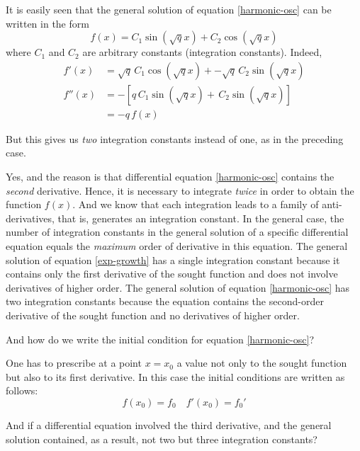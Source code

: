 It is easily seen that the general solution of equation \eqref{harmonic-osc} can be written in the form
\begin{equation}%
f(x)= C_{1} \sin (\sqrt{q} x) + C_{2} \cos (\sqrt{q}x)
 \label{harmonic-soln}
\end{equation}
where $C_{1}$ and $C_{2}$ are arbitrary constants (integration constants). Indeed, 
\begin{align*}%
f'(x) &= \sqrt{q} \, C_{1} \cos (\sqrt{q} x) + - \sqrt{q} \, C_{2} \sin (\sqrt{q}x) \\
f''(x) &= -[q  \, C_{1} \sin (\sqrt{q} x) + \, C_{2} \sin (\sqrt{q}x) ]\\
& = -q \, f(x)
\end{align*}

\rdr But this gives us \emph{two} integration constants instead of one, as in the preceding case.

\athr Yes, and the reason is that differential equation \eqref{harmonic-osc} contains the \emph{second} derivative. Hence, it is necessary to integrate \emph{twice} in order to obtain the function $f (x)$. And we know that each integration leads to a family of anti-derivatives, that is, generates an integration constant. In the general case, the number of integration constants in the general solution of a specific differential equation equals the \emph{maximum} order of derivative in this equation. The general solution of equation \eqref{exp-growth} has a single integration constant because it contains only the first derivative of the sought function and does not involve derivatives of higher order. The general solution of equation \eqref{harmonic-osc} has two integration constants because the equation contains the second-order derivative of the sought function and no derivatives of higher order.

\rdr And how do we write the initial condition for equation \eqref{harmonic-osc}?

\athr One has to prescribe at a point $x = x_{0}$ a value not only to the sought function but also to its first derivative. In this case the initial conditions are written as follows:
\begin{equation}%
f(x_{0})= f_{0} \quad f'(x_{0})= f_{0}'
\label{initial-condn}
\end{equation}

\rdr And if a differential equation involved the third derivative, and the general solution contained, as a result, not two but three integration constants? 

